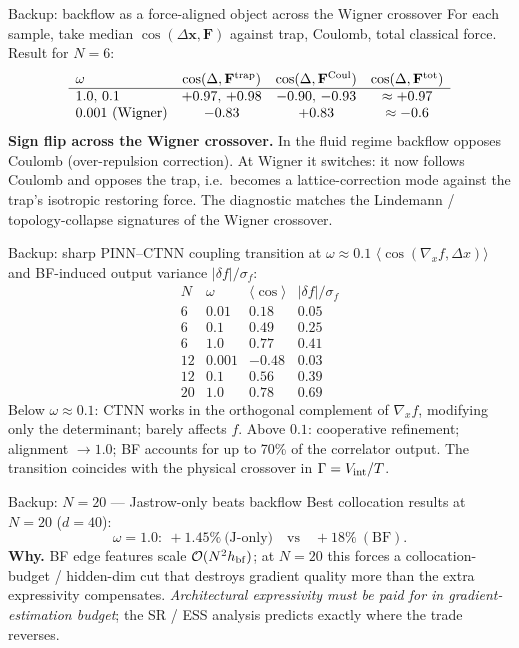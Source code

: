 \documentclass[10pt,aspectratio=169]{beamer}
\begin{document}
\begin{frame}{Backup: backflow as a force-aligned object across the Wigner crossover}
\small
For each sample, take median $\cos(\Delta\mathbf x,\mathbf F)$ against trap, Coulomb, total
classical force. Result for $N{=}6$:
\[
  \begin{array}{lccc}
  \omega          & \cos(\Delta,\mathbf F^{\rm trap}) & \cos(\Delta,\mathbf F^{\rm Coul}) & \cos(\Delta,\mathbf F^{\rm tot})\\
  \hline
  1.0,\,0.1       & +0.97,\,+0.98 & -0.90,\,-0.93 & \approx +0.97 \\
  0.001\ (\text{Wigner}) & -0.83        & +0.83        & \approx -0.6
  \end{array}
\]
\textbf{Sign flip across the Wigner crossover.} In the fluid regime backflow opposes Coulomb
(over-repulsion correction). At Wigner it switches: it now follows Coulomb and opposes the trap, i.e.\
becomes a lattice-correction mode against the trap's isotropic restoring force. The diagnostic
matches the Lindemann / topology-collapse signatures of the Wigner crossover.
\end{frame}

\begin{frame}{Backup: sharp PINN--CTNN coupling transition at $\omega \approx 0.1$}
\small
$\langle\cos(\nabla_x f,\Delta x)\rangle$ and BF-induced output variance $|\delta f|/\sigma_f$:
\[
  \begin{array}{rrcc}
  N & \omega & \langle\cos\rangle & |\delta f|/\sigma_f \\
  \hline
  6  & 0.01 & 0.18 & 0.05 \\
  6  & 0.1  & 0.49 & 0.25 \\
  6  & 1.0  & 0.77 & 0.41 \\
  12 & 0.001 & -0.48 & 0.03 \\
  12 & 0.1  & 0.56 & 0.39 \\
  20 & 1.0  & 0.78 & 0.69
  \end{array}
\]
Below $\omega\approx 0.1$: CTNN works in the orthogonal complement of $\nabla_x f$, modifying only
the determinant; barely affects $f$. Above $0.1$: cooperative refinement; alignment $\to 1.0$;
BF accounts for up to 70\% of the correlator output. The transition coincides with the physical
crossover in $\Gamma=V_{\rm int}/T$.
\end{frame}

\begin{frame}{Backup: $N{=}20$ --- Jastrow-only beats backflow}
\small
Best collocation results at $N{=}20$ ($d{=}40$):
\[
  \omega{=}1.0:\ +1.45\%\ \text{(J-only)} \quad\text{vs}\quad +18\%\ (\text{BF}).
\]
\textbf{Why.} BF edge features scale $\mathcal O(N^2 h_{\rm bf})$; at $N{=}20$ this forces a
collocation-budget / hidden-dim cut that destroys gradient quality more than the extra expressivity
compensates. \emph{Architectural expressivity must be paid for in gradient-estimation budget};
the SR / ESS analysis predicts exactly where the trade reverses.
\end{frame}
\end{document}
